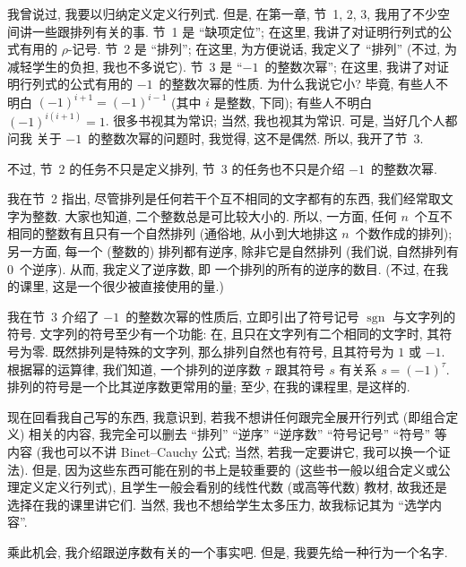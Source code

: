 \documentclass[%
    UTF8,%
    fontset=none,%
    punct=kaiming,%
    zihao=-4,%
    a4paper,%
    oneside,%
]{ctexbook}
\let\emph\relax
\begin{document}
我曾说过, 我要以归纳定义定义行列式.
但是, 在第一章, 节~1, 2, 3,
我用了不少空间讲一些跟排列有关的事.
节~1 是 ``缺项定位'';
在这里, 我讲了对证明行列式的公式有用的 \(\rho\)-记号.
节~2 是 ``排列'';
在这里, 为方便说话, 我定义了 ``排列''
(不过, 为减轻学生的负担, 我也不多说它).
节~3 是 ``\(-1\)~的整数次幂'';
在这里, 我讲了对证明行列式的公式有用的
\(-1\)~的整数次幂的\emph{小}性质.
为什么我说它小?
毕竟, 有些人不明白
\((-1)^{i+1} = (-1)^{i-1}\)
(其中 \(i\) 是整数, 下同);
有些人不明白
\((-1)^{i(i+1)} = 1\).
很多书视其为常识;
当然, 我也视其为常识.
可是, 当好几个人都问我%
关于 \(-1\)~的整数次幂的问题时,
我觉得, 这不是偶然.
所以, 我开了节~3.

不过, 节~2 的任务不只是定义排列,
节~3 的任务也不只是介绍 \(-1\)~的整数次幂.

我在节~2 指出,
尽管排列是任何若干个互不相同的文字都有的东西,
我们经常取文字为整数.
大家也知道, 二个整数总是可比较大小的.
所以, 一方面,
任何 \(n\)~个互不相同的整数有且只有一个自然排列
(通俗地, 从小到大地排这 \(n\)~个数作成的排列);
另一方面, 每一个 (整数的) 排列都有逆序,
除非它是自然排列
(我们说, 自然排列有 \(0\)~个逆序).
从而, 我定义了逆序数, 即%
一个排列的所有的逆序的数目.
(不过, 在我的课里,
这是一个很少被直接使用的量.)

我在节~3 介绍了 \(-1\)~的整数次幂的性质后,
立即引出了符号记号 \(\operatorname{sgn}\)
与文字列的符号.
文字列的符号至少有一个功能:
在, 且只在文字列有二个相同的文字时,
其符号为零.
既然排列是特殊的文字列,
那么排列自然也有符号,
且其符号为 \(1\) 或 \(-1\).
根据幂的运算律, 我们知道,
一个排列的逆序数 \(\tau\) 跟其符号 \(s\)
有关系 \(s = (-1)^{\tau}\).
排列的符号是一个比其逆序数更常用的量;
至少, 在我的课程里, 是这样的.

现在回看我自己写的东西,
我意识到,
若我不想讲任何跟完全展开行列式
(即组合定义) 相关的内容,
我完全可以删去
``排列'' ``逆序'' ``逆序数''
``符号记号'' ``符号''
等内容
(我也可以不讲 Binet--Cauchy 公式;
当然, 若我一定要讲它, 我可以换一个证法).
但是, 因为这些东西可能在别的书上是较重要的
(这些书一般以组合定义或公理定义定义行列式),
且学生一般会看别的线性代数 (或高等代数) 教材,
故我还是选择在我的课里讲它们.
当然, 我也不想给学生太多压力,
故我标记其为 ``选学内容''.

乘此机会, 我介绍跟逆序数有关的一个事实吧.
但是, 我要先给一种行为一个名字.
\end{document}
